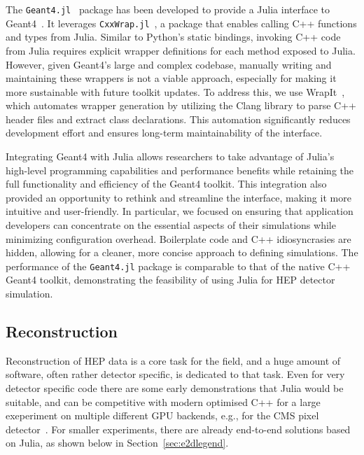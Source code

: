 \documentclass{webofc}
\begin{document}
The \texttt{Geant4.jl}~\cite{geant4-jl-github} package has been developed to
provide a Julia interface to Geant4~\cite{ALLISON2016186}. It leverages
\texttt{CxxWrap.jl}~\cite{CxxWrap.jl}, a package that enables calling C++
functions and types from Julia. Similar to Python's static bindings, invoking
C++ code from Julia requires explicit wrapper definitions for each method
exposed to Julia. However, given Geant4's large and complex codebase, manually
writing and maintaining these wrappers is not a viable approach, especially for
making it more sustainable with future toolkit updates. To address this, we use
WrapIt~\cite{wrapit-github}, which automates wrapper generation by
utilizing the Clang library to parse C++ header files and extract class
declarations. This automation significantly reduces development effort and
ensures long-term maintainability of the interface.

Integrating Geant4 with Julia allows researchers to take advantage of Julia's
high-level programming capabilities and performance benefits while retaining the
full functionality and efficiency of the Geant4 toolkit. This integration also
provided an opportunity to rethink and streamline the interface, making it more
intuitive and user-friendly. In particular, we focused on ensuring that
application developers can concentrate on the essential aspects of their
simulations while minimizing configuration overhead. Boilerplate code and C++
idiosyncrasies are hidden, allowing for a cleaner, more concise approach to
defining simulations. The performance of the \texttt{Geant4.jl} package is
comparable to that of the native C++ Geant4 toolkit, demonstrating the
feasibility of using Julia for HEP detector simulation.

\subsection{Reconstruction}

Reconstruction of HEP data is a core task for the field, and a huge amount of
software, often rather detector specific, is dedicated to that task. Even for
very detector specific code there are some early demonstrations that Julia would
be suitable, and can be competitive with modern optimised C++ for a large
exeperiment on multiple different GPU backends, e.g., for the CMS pixel
detector~\cite{patatrack_julia}. For smaller experiments, there are already
end-to-end solutions based on Julia, as shown below in
Section~\ref{sec:e2dlegend}.
\end{document}
